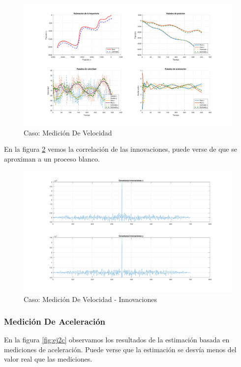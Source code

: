		\begin{figure}[H]
			\centering
			\includegraphics[width=1.0\textwidth,keepaspectratio]{Figuras/graf_ej2b.pdf}
			\caption{Caso: Medición De Velocidad}
			\label{fig:ej2b}
		\end{figure}
		
		En la figura \ref{fig:ej2b_innov} vemos la correlación de las innovaciones, puede verse de que se aproximan a un proceso blanco.
		
		\begin{figure}[H]
			\centering
			\includegraphics[width=1.0\textwidth,keepaspectratio]{Figuras/covinn_ej2b.pdf}
			\caption{Caso: Medición De Velocidad - Innovaciones}
			\label{fig:ej2b_innov}
		\end{figure}
			
		\subsubsection{Medición De Aceleración}
		
		En la figura \ref{fig:ej2c} observamos los resultados de la estimación basada en mediciones de aceleración. Puede verse que la estimación se desvía menos del valor real que las mediciones.
		
